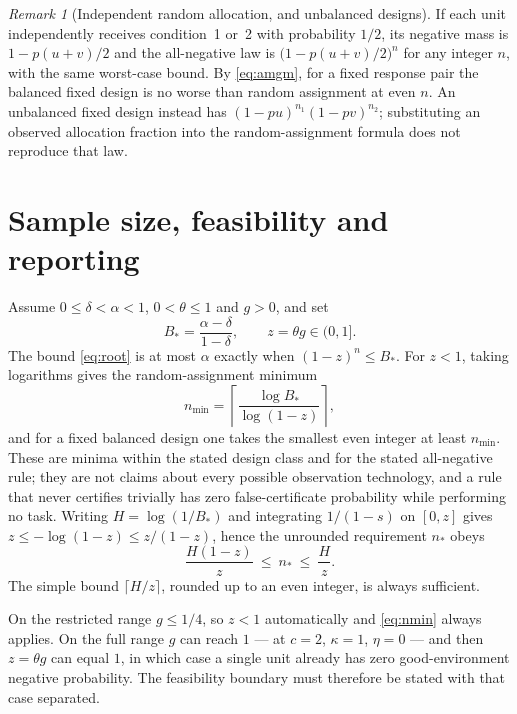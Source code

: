 \documentclass[11pt]{article}
\theoremstyle{definition}
\theoremstyle{remark}
\newtheorem{remark}[theorem]{Remark}
\begin{document}
\begin{remark}[Independent random allocation, and unbalanced designs]
If each unit independently receives condition~1 or~2 with probability $1/2$, its
negative mass is $1-p(u+v)/2$ and the all-negative law is
$\bigl(1-p(u+v)/2\bigr)^n$ for any integer $n$, with the same worst-case bound.
By \eqref{eq:amgm}, for a fixed response pair the balanced fixed design is no
worse than random assignment at even $n$. An unbalanced fixed design instead has
$(1-pu)^{n_1}(1-pv)^{n_2}$; substituting an observed allocation fraction into
the random-assignment formula does not reproduce that law.
\end{remark}

\section{Sample size, feasibility and reporting}\label{sec:sample}

Assume $0\le\delta<\alpha<1$, $0<\theta\le1$ and $g>0$, and set
\begin{equation}\label{eq:Bstar}
B_*=\frac{\alpha-\delta}{1-\delta},\qquad z=\theta g\in(0,1] .
\end{equation}
The bound \eqref{eq:root} is at most $\alpha$ exactly when $(1-z)^n\le B_*$. For
$z<1$, taking logarithms gives the random-assignment minimum
\begin{equation}\label{eq:nmin}
n_{\min}=\left\lceil\frac{\log B_*}{\log(1-z)}\right\rceil,
\end{equation}
and for a fixed balanced design one takes the smallest even integer at least
$n_{\min}$. These are minima within the stated design class and for the stated
all-negative rule; they are not claims about every possible observation
technology, and a rule that never certifies trivially has zero false-certificate
probability while performing no task. Writing $H=\log(1/B_*)$ and integrating
$1/(1-s)$ on $[0,z]$ gives $z\le-\log(1-z)\le z/(1-z)$, hence the unrounded
requirement $n_*$ obeys
\begin{equation}\label{eq:sandwich}
\frac{H(1-z)}{z}\ \le\ n_*\ \le\ \frac Hz .
\end{equation}
The simple bound $\lceil H/z\rceil$, rounded up to an even integer, is always
sufficient.

On the restricted range $g\le1/4$, so $z<1$ automatically and \eqref{eq:nmin}
always applies. On the full range $g$ can reach $1$ --- at $c=2$, $\kappa=1$,
$\eta=0$ --- and then $z=\theta g$ can equal $1$, in which case a single unit
already has zero good-environment negative probability. The feasibility boundary
must therefore be stated with that case separated.
\end{document}

